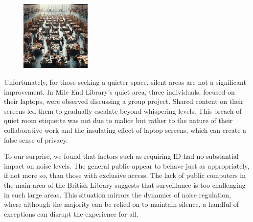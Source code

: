 \documentclass{novel}
\begin{document}
\begin{figure} 
\vspace{-\intextsep}
    \includegraphics[width=0.31\textwidth]{resources/mileEnd.jpg}
    \vspace{-20pt} %
\end{figure}

Unfortunately, for those seeking a quieter space, silent areas are not a significant improvement. In Mile End Library's quiet area, three individuals, focused on their laptops, were observed discussing a group project. Shared content on their screens led them to gradually escalate beyond whispering levels. This breach of quiet room etiquette was not due to malice but rather to the nature of their collaborative work and the insulating effect of laptop screens, which can create a false sense of privacy.

To our surprise, we found that factors such as requiring ID had no substantial impact on noise levels. The general public appear to behave just as appropriately, if not more so, than those with exclusive access. The lack of public computers in the main area of the British Library suggests that surveillance is too challenging in such large areas. This situation mirrors the dynamics of noise regulation, where although the majority can be relied on to maintain silence, a handful of exceptions can disrupt the experience for all.
\end{document}

